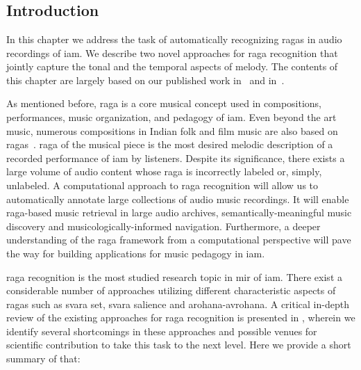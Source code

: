 
\chapter{}
\label{chap:raga_recognition}


\section{Introduction}
\label{sec:raga_rec_intro}

In this chapter we address the task of automatically recognizing \glspl{raga} in audio recordings of \gls{iam}. We describe two novel approaches for \gls{raga} recognition that jointly capture the tonal and the temporal aspects of melody. The contents of this chapter are largely based on our published work in~\cite{gulatiphrase_2016} and in~\cite{gulati_tdms_2016}.

As mentioned before, \gls{raga} is a core musical concept used in compositions, performances, music organization, and pedagogy of \gls{iam}. Even beyond the art music, numerous compositions in Indian folk and film music are also based on \glspl{raga}~\citep{ganti2013bollywood}. \Gls{raga} of the musical piece is the most desired melodic description of a recorded performance of \gls{iam} by listeners. Despite its significance, there exists a large volume of audio content whose \gls{raga} is incorrectly labeled or, simply, unlabeled. A computational approach to \gls{raga} recognition will allow us to automatically annotate large collections of audio music recordings. It will enable \gls{raga}-based music retrieval in large audio archives, semantically-meaningful music discovery and musicologically-informed navigation. Furthermore, a deeper understanding of the \gls{raga} framework from a computational perspective will pave the way for building applications for music pedagogy in \gls{iam}. 

\Gls{raga} recognition is the most studied research topic in \gls{mir} of \gls{iam}. There exist a considerable number of approaches utilizing different characteristic aspects of \glspl{raga} such as \gls{svara} set, \gls{svara} salience and \gls{arohana}-\gls{avrohana}. A critical in-depth review of the existing approaches for \gls{raga} recognition is presented in , wherein we identify several shortcomings in these approaches and possible venues for scientific contribution to take this task to the next level. Here we provide a short summary of that: 

